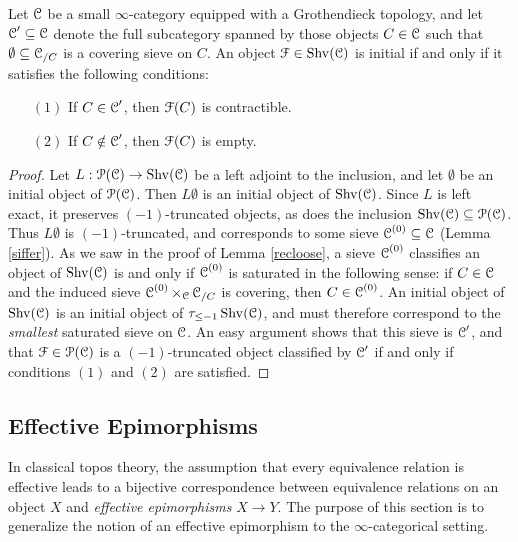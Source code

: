 \begin{proposition}\label{suture}
Let $\operatorname{\mathcal{C}}$ be a small $\infty$-category equipped with a Grothendieck topology, and let
$\operatorname{\mathcal{C}}' \subseteq \operatorname{\mathcal{C}}$ denote the full subcategory spanned by those objects
$C \in \operatorname{\mathcal{C}}$ such that $\emptyset \subseteq \operatorname{\mathcal{C}}_{/C}$ is a covering sieve on $C$.
An object $\operatorname{\mathcal{F}} \in \operatorname{Shv}(\operatorname{\mathcal{C}})$ is initial if and only if it satisfies the following conditions:
\begin{itemize}
\item[$(1)$] If $C \in \operatorname{\mathcal{C}}'$, then $\operatorname{\mathcal{F}}(C)$ is contractible.
\item[$(2)$] If $C \notin \operatorname{\mathcal{C}}'$, then $\operatorname{\mathcal{F}}(C)$ is empty.
\end{itemize}
\end{proposition}

\begin{proof}
Let $L: \operatorname{\mathcal{P}}(\operatorname{\mathcal{C}}) \rightarrow \operatorname{Shv}(\operatorname{\mathcal{C}})$ be a left adjoint to the inclusion, and
let $\emptyset$ be an initial object of $\operatorname{\mathcal{P}}(\operatorname{\mathcal{C}})$. Then $L \emptyset$ is an initial object of $\operatorname{Shv}(\operatorname{\mathcal{C}})$. Since $L$ is left exact, it preserves $(-1)$-truncated objects, as does the inclusion
$\operatorname{Shv}(\operatorname{\mathcal{C}}) \subseteq \operatorname{\mathcal{P}}(\operatorname{\mathcal{C}})$. Thus $L \emptyset$ is $(-1)$-truncated, and corresponds to some sieve $\operatorname{\mathcal{C}}^{(0)} \subseteq \operatorname{\mathcal{C}}$ (Lemma \ref{siffer}). As we saw in the proof of Lemma \ref{recloose}, a sieve $\operatorname{\mathcal{C}}^{(0)}$ classifies an object of
$\operatorname{Shv}(\operatorname{\mathcal{C}})$ is and only if $\operatorname{\mathcal{C}}^{(0)}$ is saturated in the following sense:
if $C \in \operatorname{\mathcal{C}}$ and the induced sieve $\operatorname{\mathcal{C}}^{(0)} \times_{\operatorname{\mathcal{C}}} \operatorname{\mathcal{C}}_{/C}$ is covering,
then $C \in \operatorname{\mathcal{C}}^{(0)}$. An initial object
of $\operatorname{Shv}(\operatorname{\mathcal{C}})$ is an initial object of $\tau_{\leq -1} \operatorname{Shv}(\operatorname{\mathcal{C}})$, and must therefore
correspond to the {\em smallest} saturated sieve on $\operatorname{\mathcal{C}}$. An easy argument shows that this sieve is $\operatorname{\mathcal{C}}'$, and that $\operatorname{\mathcal{F}} \in \operatorname{\mathcal{P}}(\operatorname{\mathcal{C}})$ is a $(-1)$-truncated object classified by
$\operatorname{\mathcal{C}}'$ if and only if conditions $(1)$ and $(2)$ are satisfied.
\end{proof}

\subsection{Effective Epimorphisms}\label{surjsurj}

In classical topos theory, the assumption that every equivalence relation is effective
leads to a bijective correspondence between equivalence relations on an object $X$
and {\em effective epimorphisms} $X \rightarrow Y$. The purpose of this section is to
generalize the notion of an effective epimorphism to the $\infty$-categorical setting.

